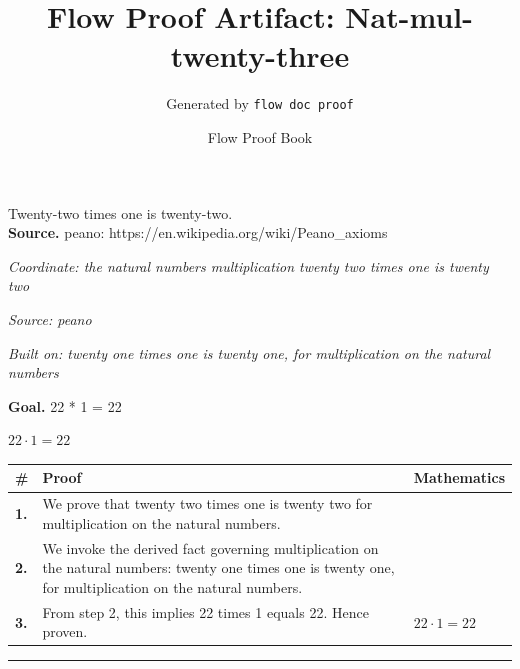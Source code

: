 \documentclass[11pt]{article}
\title{Flow Proof Artifact: Nat-mul-twenty-three}
\author{Generated by \texttt{flow doc proof}}
\date{Flow Proof Book}
\theoremstyle{definition}
\begin{document}
\maketitle
Twenty-two times one is twenty-two.\\[0.5em]
\textbf{Source.} peano: https://en.wikipedia.org/wiki/Peano\_axioms\\[0.5em]
\bigskip
{}\par
\smallskip\noindent\textit{Coordinate: the natural numbers \cdot multiplication \cdot twenty two times one is twenty two}\par
\smallskip\noindent\textit{Source: peano}\par
\smallskip\noindent\textit{Built on: twenty one times one is twenty one, for multiplication on the natural numbers}\par
\medskip
\noindent\textbf{Goal.} 22 * 1 = 22\par
\noindent$\displaystyle 22 \cdot 1 = 22$\par
\medskip
\noindent
\begin{tabular}{@{} >{\raggedright\arraybackslash}p{} >{\raggedright\arraybackslash}p{} >{\raggedleft\arraybackslash}p{} @{}}
\textbf{\#} & \textbf{Proof} & \textbf{Mathematics} \\
\midrule
\textbf{1.} & We prove that twenty two times one is twenty two for multiplication on the natural numbers. & \\[0.45em]
\textbf{2.} & We invoke the derived fact governing multiplication on the natural numbers: twenty one times one is twenty one, for multiplication on the natural numbers. & \\[0.45em]
\textbf{3.} & From step 2, this implies 22 times 1 equals 22. Hence proven. & $\displaystyle 22 \cdot 1 = 22$ \\[0.45em]
\bottomrule
\end{tabular}
\label{thm:Nat-multiplication-twenty_two_times_one_is_twenty_two}
\par\medskip\hrule
\end{document}

